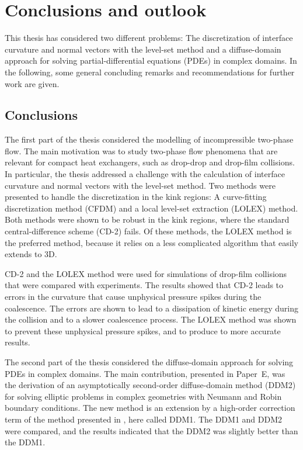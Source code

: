 \documentclass[11pt,b5paper,DIV=calc,BCOR1.3cm,headings=small,%
               footinclude=false,headsepline]{scrbook}
\begin{document}
\chapter{Conclusions and outlook}
\label{chap:conclusions}
This thesis has considered two different problems:  The discretization of
interface curvature and normal vectors with the level-set method and
a diffuse-domain approach for solving partial-differential equations (PDEs) in
complex domains.  In the following, some general concluding remarks and
recommendations for further work are given.

\section*{Conclusions}
The first part of the thesis considered the modelling of incompressible
two-phase flow.  The main motivation was to study two-phase flow phenomena that
are relevant for compact heat exchangers, such as drop-drop and drop-film
collisions.  In particular, the thesis addressed a challenge with the
calculation of interface curvature and normal vectors with the level-set
method.  Two methods were presented to handle the discretization in the kink
regions: A curve-fitting discretization method (CFDM) and a local level-set
extraction (LOLEX) method.  Both methods were shown to be robust in the kink
regions, where the standard central-difference scheme (CD-2) fails.  Of these
methods, the LOLEX method is the preferred method, because it relies on a less
complicated algorithm that easily extends to 3D.

CD-2 and the LOLEX method were used for simulations of drop-film collisions
that were compared with experiments.  The results showed that CD-2 leads to
errors in the curvature that cause unphysical pressure spikes during the
coalescence.  The errors are shown to lead to a dissipation of kinetic energy
during the collision and to a slower coalescence process.  The LOLEX method was
shown to prevent these unphysical pressure spikes, and to produce to more
accurate results.

The second part of the thesis considered the diffuse-domain approach for
solving PDEs in complex domains.  The main contribution, presented in Paper~E,
was the derivation of an asymptotically second-order diffuse-domain method
(DDM2) for solving elliptic problems in complex geometries with Neumann and
Robin boundary conditions.  The new method is an extension by a high-order
correction term of the method presented in \cite{Li09}, here called DDM1.  The
DDM1 and DDM2 were compared, and the results indicated that the DDM2 was
slightly better than the DDM1.
\end{document}

